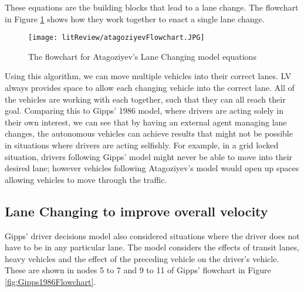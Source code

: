 These equations are the building blocks that lead to a lane change. The flowchart in Figure \ref{fig:AtogoziyevFlowchart} shows how they work together to enact a single lane change.

\begin{figure}[htb]
\texttt{[image: litReview/atagoziyevFlowchart.JPG]}
\caption{The flowchart for Atagoziyev's Lane Changing model equations}
\label{fig:AtogoziyevFlowchart}
\end{figure}

Using this algorithm, we can move multiple vehicles into their correct lanes. LV always provides space to allow each changing vehicle into the correct lane. All of the vehicles are working with each together, such that they can all reach their goal. Comparing this to Gipps' 1986 model, where drivers are acting solely in their own interest, we can see that by having an external agent managing lane changes, the autonomous vehicles can achieve results that might not be possible in situations where drivers are acting selfishly. For example, in a grid locked situation, drivers following Gipps' model might never be able to move into their desired lane; however vehicles following Atagoziyev's model would open up spaces allowing vehicles to move through the traffic.

\subsection{Lane Changing to improve overall velocity}
\label{subsec:Lane Changing to improve overall velocity}
Gipps' driver decisions model also considered situations where the driver does not have to be in any particular lane. The model considers the effects of transit lanes, heavy vehicles and the effect of the preceding vehicle on the driver's vehicle. These are shown in nodes 5 to 7 and 9 to 11 of Gipps' flowchart in Figure \ref{fig:Gipps1986Flowchart}.

